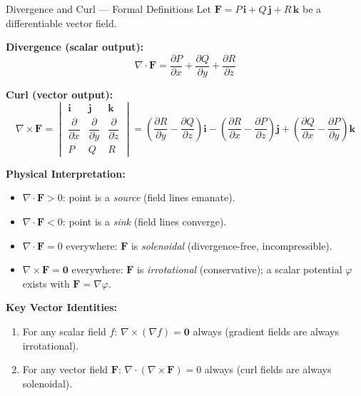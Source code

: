 \documentclass[12pt,a4paper]{article}
\begin{document}
\begin{infobox}{Divergence and Curl --- Formal Definitions}
Let $\mathbf{F} = P\,\mathbf{i} + Q\,\mathbf{j} + R\,\mathbf{k}$ be a differentiable vector field.

\textbf{Divergence (scalar output):}
\[
  \nabla \cdot \mathbf{F} = \frac{\partial P}{\partial x} + \frac{\partial Q}{\partial y} + \frac{\partial R}{\partial z}
\]

\textbf{Curl (vector output):}
\[
  \nabla \times \mathbf{F} =
  \begin{vmatrix}
    \mathbf{i} & \mathbf{j} & \mathbf{k} \\
    \dfrac{\partial}{\partial x} & \dfrac{\partial}{\partial y} & \dfrac{\partial}{\partial z} \\[4pt]
    P & Q & R
  \end{vmatrix}
  = \left(\frac{\partial R}{\partial y} - \frac{\partial Q}{\partial z}\right)\mathbf{i}
  - \left(\frac{\partial R}{\partial x} - \frac{\partial P}{\partial z}\right)\mathbf{j}
  + \left(\frac{\partial Q}{\partial x} - \frac{\partial P}{\partial y}\right)\mathbf{k}
\]

\textbf{Physical Interpretation:}
\begin{itemize}[leftmargin=*]
  \item $\nabla \cdot \mathbf{F} > 0$: point is a \emph{source} (field lines emanate).
  \item $\nabla \cdot \mathbf{F} < 0$: point is a \emph{sink} (field lines converge).
  \item $\nabla \cdot \mathbf{F} = 0$ everywhere: $\mathbf{F}$ is \emph{solenoidal} (divergence-free, incompressible).
  \item $\nabla \times \mathbf{F} = \mathbf{0}$ everywhere: $\mathbf{F}$ is \emph{irrotational} (conservative); a scalar potential $\varphi$ exists with $\mathbf{F} = \nabla \varphi$.
\end{itemize}

\textbf{Key Vector Identities:}
\begin{enumerate}[leftmargin=*]
  \item For any scalar field $f$: $\nabla \times (\nabla f) = \mathbf{0}$ always (gradient fields are always irrotational).
  \item For any vector field $\mathbf{F}$: $\nabla \cdot (\nabla \times \mathbf{F}) = 0$ always (curl fields are always solenoidal).
\end{enumerate}
\end{infobox}
\end{document}
